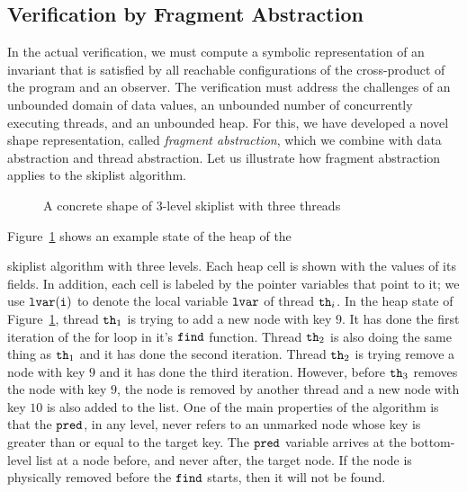 \subsection{Verification by Fragment Abstraction}

In the actual verification, we must compute a symbolic representation
of an invariant that is satisfied by all reachable configurations of
the cross-product of the program  and an observer.
The verification must address the challenges of an unbounded domain of
data values, an unbounded number of concurrently executing threads, and an
unbounded heap.
For this, we have developed a novel shape representation, called
{\em fragment abstraction}, which we combine with
data abstraction and thread abstraction.
Let us illustrate how fragment abstraction applies to the skiplist
algorithm.
\begin{figure}
\center  
   
 \caption{A concrete shape of 3-level skiplist with three threads}
\label{sl-shape}
\end{figure}


Figure~\ref{sl-shape} shows an example state of the heap of the

skiplist algorithm with three levels. Each heap cell is shown with the values of its fields. 
In addition, each cell is labeled by the
pointer variables that point to it; we use ${\tt lvar(i)}$ to denote the local
variable ${\tt lvar}$ of thread ${\tt th}_i$.
In the heap state of Figure~\ref{sl-shape}, thread ${\tt th}_1$ is trying to add a new node with key $9$. It has done the first iteration of the for loop in it's $\tt find$ function. Thread ${\tt th}_2$ is also doing the same thing as ${\tt th}_1$ and it has done the second iteration. Thread ${\tt th}_2$ is trying remove a node with key $9$ and it has done the third iteration.
However, before ${\tt th}_3$ removes the node with key $9$, the node is removed by another thread and a new node with key $10$ is also added to the list. One of the main properties of the algorithm is that 
the $\tt pred$, in any level, never refers to an unmarked node whose key is greater than or equal to the target key. The $\tt pred$ variable arrives at the bottom-level list at a node before, and never after, the target node. If the node is physically removed before the $\tt find$ starts, then it will not be found.



